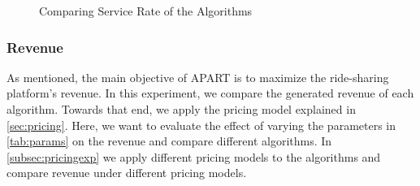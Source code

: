 \begin{figure}[h]
    \centering
    \vspace{-0.15in}
    \caption{Comparing Service Rate of the Algorithms}
    \label{fig:sr}
\end{figure}

\vspace{-5mm}
\subsubsection{Revenue}
As mentioned, the main objective of APART is to maximize the ride-sharing platform's revenue. In this experiment, we compare the generated revenue of each algorithm. Towards that end, we apply the pricing model explained in \cref{sec:pricing}. Here, we want to evaluate the effect of varying the parameters in \cref{tab:params} on the revenue and compare different algorithms. In \cref{subsec:pricingexp} we apply different pricing models to the algorithms and compare revenue under different pricing models.


